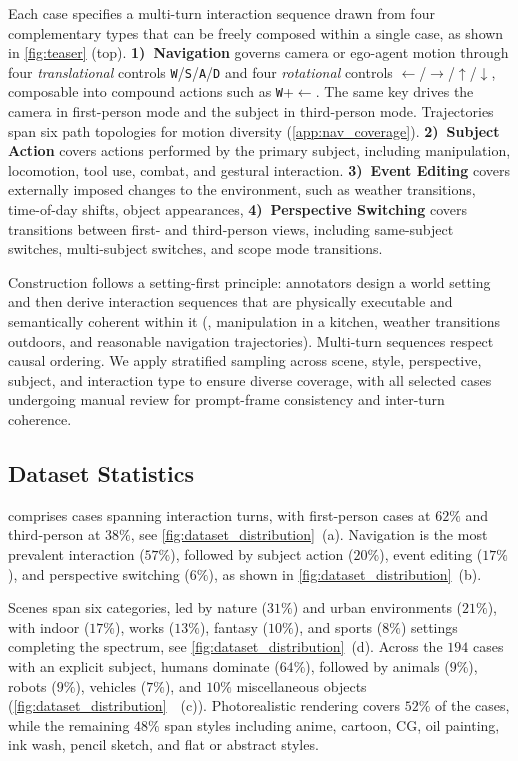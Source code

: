 Each case specifies a multi-turn interaction sequence drawn from four complementary types that can be freely composed within a single case, as shown in \cref{fig:teaser} (top).
\textbf{1)~Navigation} governs camera or ego-agent motion through four \emph{translational} controls \texttt{W}/\texttt{S}/\texttt{A}/\texttt{D} and four \emph{rotational} controls $\leftarrow$/$\rightarrow$/$\uparrow$/$\downarrow$, composable into compound actions such as \texttt{W}+$\leftarrow$. The same key drives the camera in first-person mode and the subject in third-person mode. Trajectories span six path topologies for motion diversity (\cref{app:nav_coverage}).
\textbf{2)~Subject Action} covers actions performed by the primary subject, including manipulation, locomotion, tool use, combat, and gestural interaction.
\textbf{3)~Event Editing} covers externally imposed changes to the environment, such as weather transitions, time-of-day shifts, object appearances, \etc
\textbf{4)~Perspective Switching} covers transitions between first- and third-person views, including same-subject switches, multi-subject switches, and scope mode transitions.

Construction follows a setting-first principle: annotators design a world setting and then derive interaction sequences that are physically executable and semantically coherent within it (\eg, manipulation in a kitchen, weather transitions outdoors, and reasonable navigation trajectories). Multi-turn sequences respect causal ordering. We apply stratified sampling across scene, style, perspective, subject, and interaction type to ensure diverse coverage, with all selected cases undergoing manual review for prompt-frame consistency and inter-turn coherence.

\subsection{Dataset Statistics}
\label{sec:statistics}


\benchmark comprises \numvideo cases spanning \numturn interaction turns, with first-person cases at $62\%$ and third-person at $38\%$, see \cref{fig:dataset_distribution}~\!(a). Navigation is the most prevalent interaction ($57\%$), followed by subject action ($20\%$), event editing ($17\%$), and perspective switching ($6\%$), as shown in \cref{fig:dataset_distribution}~\!(b).

 Scenes span six categories, led by nature ($31\%$) and urban environments ($21\%$), with indoor ($17\%$), works ($13\%$), fantasy ($10\%$), and sports ($8\%$) settings completing the spectrum, see \cref{fig:dataset_distribution}~\!(d). Across the $194$ cases with an explicit subject, humans dominate ($64\%$), followed by animals ($9\%$), robots ($9\%$), vehicles ($7\%$), and $10\%$ miscellaneous objects (\cref{fig:dataset_distribution}~~(c)). Photorealistic rendering covers $52\%$ of the cases, while the remaining $48\%$ span styles including anime, cartoon, CG, oil painting, ink wash, pencil sketch, and flat or abstract styles.

